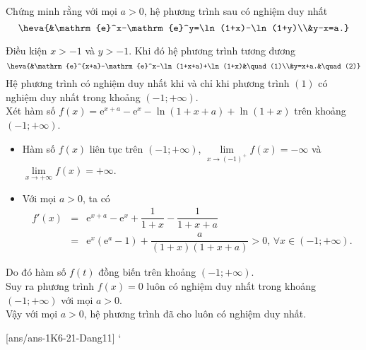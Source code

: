 \begin{bt}%
	Chứng minh rằng với mọi $a>0$, hệ phương trình sau có nghiệm duy nhất
	$$\heva{&\mathrm{e}^x-\mathrm{e}^y=\ln(1+x)-\ln(1+y)\\&y-x=a.}$$
	\loigiai
	{Điều kiện $x>-1$ và $y>-1$. Khi đó hệ phương trình tương đương
		$$\heva{&\mathrm{e}^{x+a}-\mathrm{e}^x-\ln(1+x+a)+\ln(1+x)&\quad (1)\\&y=x+a.&\quad (2)}$$
		Hệ phương trình có nghiệm duy nhất khi và chỉ khi phương trình $(1)$ có nghiệm duy nhất trong khoảng $(-1;+\infty)$.\\
		Xét hàm số $f(x)=\mathrm{e}^{x+a}-\mathrm{e}^x-\ln(1+x+a)+\ln(1+x)$ trên khoảng $(-1;+\infty)$.
		\begin{itemize}
			\item Hàm số $f(x)$ liên tục trên $(-1;+\infty)$, $\lim\limits_{x \to (-1)^+} f(x)=-\infty$ và $\lim\limits_{x \to +\infty} f(x)=+\infty$.
			\item Với mọi $a>0$, ta có
			\allowdisplaybreaks
			\begin{eqnarray*}
				f'(x) &=& \mathrm{e}^{x+a}-\mathrm{e}^x+\dfrac{1}{1+x}-\dfrac{1}{1+x+a}\\
				&=& \mathrm{e}^{x}\left(\mathrm{e}^a-1\right) +\dfrac{a}{(1+x)(1+x+a)}>0,\, \forall x\in (-1;+\infty).
			\end{eqnarray*}
		\end{itemize}
		Do đó hàm số $f(t)$ đồng biến trên khoảng $(-1;+\infty)$.\\
		Suy ra phương trình $f(x)=0$ luôn có nghiệm duy nhất trong khoảng $(-1;+\infty)$ với mọi $a>0$.\\
		Vậy với mọi $a>0$, hệ phương trình đã cho luôn có nghiệm duy nhất.
	}
\end{bt}
\centerline{}
[ans/ans-1K6-21-Dang11]
`
